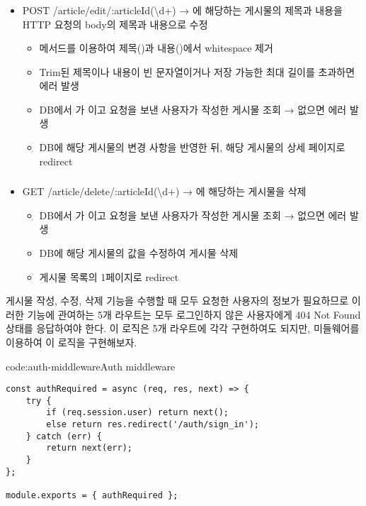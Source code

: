 \subsubsection*{}
\begin{itemize}
    \item POST /article/edit/:articleId(\textbackslash{}d+) → 에 해당하는 게시물의 제목과 내용을 HTTP 요청의 body의 제목과 내용으로 수정
    \begin{itemize}
        \item {} 메서드를 이용하여 제목()과 내용()에서 whitespace 제거
        \item Trim된 제목이나 내용이 빈 문자열이거나 저장 가능한 최대 길이를 초과하면  에러 발생
        \item DB에서 가 이고 요청을 보낸 사용자가 작성한 게시물 조회 → 없으면  에러 발생
        \item DB에 해당 게시물의 변경 사항을 반영한 뒤, 해당 게시물의 상세 페이지로 redirect
    \end{itemize}
\end{itemize}

\subsubsection*{}
\begin{itemize}
    \item GET /article/delete/:articleId(\textbackslash{}d+) → 에 해당하는 게시물을 삭제
    \begin{itemize}
        \item DB에서 가 이고 요청을 보낸 사용자가 작성한 게시물 조회 → 없으면  에러 발생
        \item DB에 해당 게시물의  값을 수정하여 게시물 삭제
        \item 게시물 목록의 1페이지로 redirect
    \end{itemize}
\end{itemize}

게시물 작성, 수정, 삭제 기능을 수행할 때 모두 요청한 사용자의 정보가 필요하므로 이러한 기능에 관여하는 5개 라우트는 모두 로그인하지 않은 사용자에게 404 Not Found 상태를 응답하여야 한다. 이 로직은 5개 라우트에 각각 구현하여도 되지만, 미들웨어를 이용하여 이 로직을 구현해보자.

\begin{code}{code:auth-middleware}{Auth middleware}
\begin{verbatim}
const authRequired = async (req, res, next) => {
    try {
        if (req.session.user) return next();
        else return res.redirect('/auth/sign_in');
    } catch (err) {
        return next(err);
    }
};

module.exports = { authRequired };
\end{verbatim}
\end{code}

